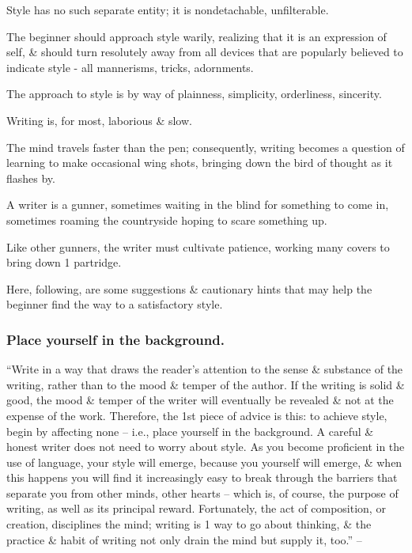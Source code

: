 \documentclass{article}
\begin{document}
Style has no such separate entity; it is nondetachable, unfilterable.

The beginner should approach style warily, realizing that it is an expression of self, \& should turn resolutely away from all devices that are popularly believed to indicate style - all mannerisms, tricks, adornments.

The approach to style is by way of plainness, simplicity, orderliness, sincerity.

%
Writing is, for most, laborious \& slow.

The mind travels faster than the pen; consequently, writing becomes a question of learning to make occasional wing shots, bringing down the bird of thought as it flashes by.

A writer is a gunner, sometimes waiting in the blind for something to come in, sometimes roaming the countryside hoping to scare something up.

Like other gunners, the writer must cultivate patience, working many covers to bring down 1 partridge.

Here, following, are some suggestions \& cautionary hints that may help the beginner find the way to a satisfactory style.

\subsubsection{Place yourself in the background.}
``Write in a way that draws the reader's attention to the sense \& substance of the writing, rather than to the mood \& temper of the author. If the writing is solid \& good, the mood \& temper of the writer will eventually be revealed \& not at the expense of the work. Therefore, the 1st piece of advice is this: to achieve style, begin by affecting none -- i.e., place yourself in the background. A careful \& honest writer does not need to worry about style. As you become proficient in the use of language, your style will emerge, because you yourself will emerge, \& when this happens you will find it increasingly easy to break through the barriers that separate you from other minds, other hearts -- which is, of course, the purpose of writing, as well as its principal reward. Fortunately, the act of composition, or creation, disciplines the mind; writing is 1 way to go about thinking, \& the practice \& habit of writing not only drain the mind but supply it, too.'' -- \cite[p. 78]{Strunk_White_element_style}

\end{document}
